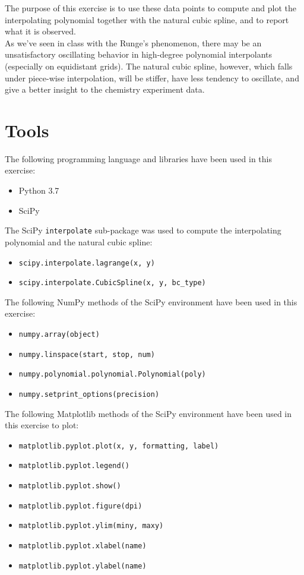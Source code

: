 \documentclass{article}
\newcommand{\code}{\texttt}
\begin{document}
The purpose of this exercise is to use these data points to compute and plot the interpolating polynomial together with the natural cubic spline, and to report what it is observed.\\

As we've seen in class with the Runge's phenomenon, there may be an unsatisfactory oscillating behavior in high-degree polynomial interpolants (especially on equidistant grids). The natural cubic spline, however, which falls under piece-wise interpolation, will be stiffer, have less tendency to oscillate, and give a better insight to the chemistry experiment data. 

\section{Tools}
The following programming language and libraries have been used in this exercise:
\begin{itemize}
  \item Python 3.7
  \item SciPy
\end{itemize}
The SciPy \code{interpolate} sub-package was used to compute the interpolating polynomial and the natural cubic spline:
\begin{itemize}
  \item \code{scipy.interpolate.lagrange(x, y)}
  \item \code{scipy.interpolate.CubicSpline(x, y, bc\_type)}
\end{itemize}

The following NumPy methods of the SciPy environment have been used in this exercise:
\begin{itemize}
  \item \code{numpy.array(object)}
  \item \code{numpy.linspace(start, stop, num)}
  \item \code{numpy.polynomial.polynomial.Polynomial(poly)}
  \item \code{numpy.setprint\_options(precision)}
  \end{itemize}
The following Matplotlib methods of the SciPy environment have been used in this exercise to plot:
 \begin{itemize}
  \item \code{matplotlib.pyplot.plot(x, y, formatting, label)}
  \item \code{matplotlib.pyplot.legend()}
  \item \code{matplotlib.pyplot.show()}
  \item \code{matplotlib.pyplot.figure(dpi)}
  \item \code{matplotlib.pyplot.ylim(miny, maxy)}
  \item \code{matplotlib.pyplot.xlabel(name)}
  \item \code{matplotlib.pyplot.ylabel(name)}
  \end{itemize}
  
\end{document}
